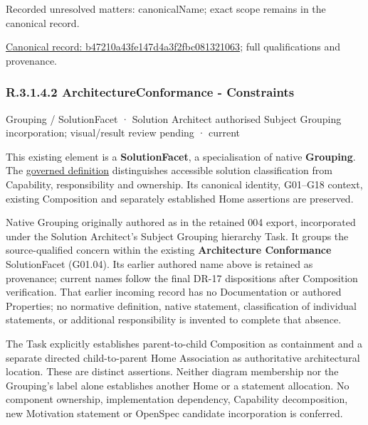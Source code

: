 {\small Recorded unresolved matters: canonicalName; exact scope remains in the canonical record.}\par
{\footnotesize \href{../../../../../../../continuum/grouping/b47210a43fe147d4a3f2fbc081321063.md}{Canonical record: b47210a43fe147d4a3f2fbc081321063}; full qualifications and provenance.}\par
\subsubsection*{R.3.1.4.2 ArchitectureConformance - Constraints}
\label{navigation:R.3.1.4.2}

\label{element:46dd1f4490ae47cc854ce70ff600cb47}
{\small Grouping / SolutionFacet · Solution Architect authorised Subject Grouping incorporation; visual/result review pending · current}\par

This existing element is a \textbf{SolutionFacet}, a specialisation of native
\textbf{Grouping}. The \href{\detokenize{../../../../../../../governance/continuum-representation.md#solutionfacet-classification--1119-candidate}}{governed definition}
distinguishes accessible solution classification from Capability, responsibility
and ownership. Its canonical identity, G01–G18 context, existing Composition
and separately established Home assertions are preserved.



Native Grouping originally authored as \texttt{} in the retained 004 export,
incorporated under the Solution Architect's Subject Grouping hierarchy Task.
It groups the source-qualified \texttt{} concern within
the existing \textbf{Architecture Conformance} SolutionFacet (G01.04). Its earlier authored name above is retained as provenance; current names
follow the final DR-17 dispositions after Composition verification.
That earlier incoming record has no Documentation or authored Properties; no normative
definition, native statement, classification of individual statements, or
additional responsibility is invented to complete that absence.



The Task explicitly establishes parent-to-child Composition as containment and
a separate directed child-to-parent Home Association as authoritative architectural
location. These are distinct assertions. Neither diagram membership nor the
Grouping's label alone establishes another Home or a statement allocation.
No component ownership, implementation dependency, Capability decomposition,
new Motivation statement or OpenSpec candidate incorporation is conferred.




